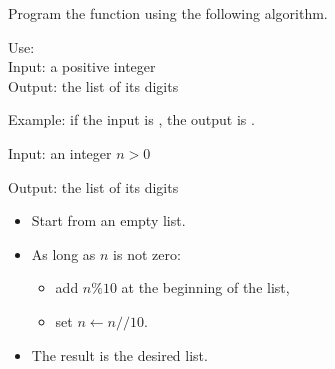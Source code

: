 \documentclass[11pt,class=report,crop=false]{standalone}
\begin{document}


\begin{activite}


Program the function  using the following algorithm.

 
   \begin{fonction}
  Use:  \\
  Input: a positive integer \\
  Output: the list of its digits
  
  \medskip
    
  Example: if the input is , the output is \ci{[1,2,3,4]}.
  \end{fonction}


  \begin{algorithme}
  Input: an integer $n>0$

  Output: the list of its digits 

  \begin{itemize}
    \item Start from an empty list.
    
    \item As long as $n$ is not zero:
    
     \begin{itemize} 
       \item add $n \% 10$ at the beginning of the list,
       \item set $n \leftarrow n//10$.
     \end{itemize}    
         
    \item The result is the desired list.
  \end{itemize} 
             
 \end{algorithme}
 
  

\end{activite}
\end{document}
